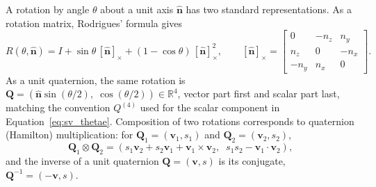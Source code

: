 A rotation by angle $\theta$ about a unit axis $\hat{\mathbf{n}}$ has two standard representations.
As a rotation matrix, Rodrigues' formula gives
\begin{equation}
R(\theta, \hat{\mathbf{n}}) = I + \sin\theta\,[\hat{\mathbf{n}}]_\times + (1-\cos\theta)\,[\hat{\mathbf{n}}]_\times^2,
\qquad
[\hat{\mathbf{n}}]_\times = \begin{bmatrix} 0 & -n_z & n_y \\ n_z & 0 & -n_x \\ -n_y & n_x & 0 \end{bmatrix}.
\label{eq:appA_rodrigues}
\end{equation}
As a unit quaternion, the same rotation is $\mathbf{Q} = \left( \hat{\mathbf{n}}\sin(\theta/2),\;
\cos(\theta/2) \right) \in \mathbb{R}^4$, vector part first and scalar part last, matching the
convention $Q^{(4)}$ used for the scalar component in Equation~\eqref{eq:sv_thetae}. Composition of
two rotations corresponds to quaternion (Hamilton) multiplication: for $\mathbf{Q}_1 = (\mathbf{v}_1,
s_1)$ and $\mathbf{Q}_2 = (\mathbf{v}_2, s_2)$,
\begin{equation}
\mathbf{Q}_1 \otimes \mathbf{Q}_2 = \left( s_1\mathbf{v}_2 + s_2\mathbf{v}_1 + \mathbf{v}_1\times\mathbf{v}_2,\;\;
s_1 s_2 - \mathbf{v}_1 \cdot \mathbf{v}_2 \right),
\label{eq:appA_quatmul}
\end{equation}
and the inverse of a unit quaternion $\mathbf{Q}=(\mathbf{v},s)$ is its conjugate, $\mathbf{Q}^{-1} =
(-\mathbf{v}, s)$.

